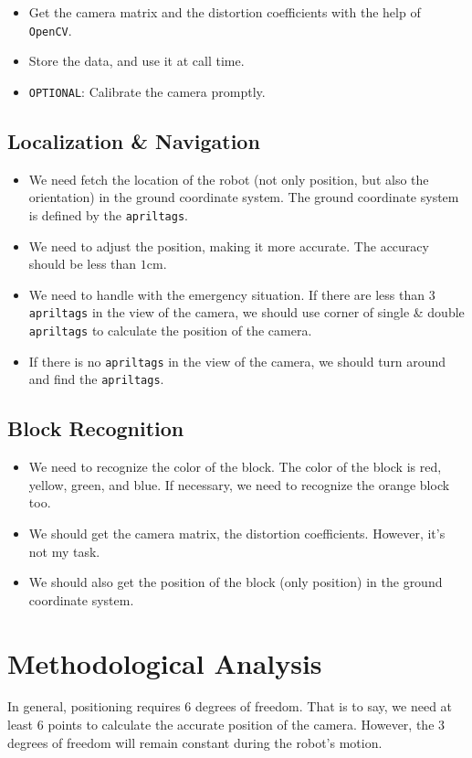 \documentclass{article}
\begin{document}
\begin{itemize}
  \item Get the camera matrix and the distortion coefficients with the help of \texttt{OpenCV}.
  \item Store the data, and use it at call time.
  \item \texttt{OPTIONAL}: Calibrate the camera promptly.
\end{itemize}

\subsection{Localization \& Navigation}

\begin{itemize}
  \item We need fetch the location of the robot (not only position, but also the orientation) in the ground coordinate system. The ground coordinate system is defined by the \texttt{apriltags}.
  \item We need to adjust the position, making it more accurate. The accuracy should be less than $1\mathrm{cm}$.
  \item We need to handle with the emergency situation. If there are less than $3$ \texttt{apriltags} in the view of the camera, we should use corner of single \& double \texttt{apriltags} to calculate the position of the camera.
  \item If there is no \texttt{apriltags} in the view of the camera, we should turn around and find the \texttt{apriltags}.
\end{itemize}

\subsection{Block Recognition}

\begin{itemize}
  \item We need to recognize the color of the block. The color of the block is red, yellow, green, and blue. If necessary, we need to recognize the orange block too.
  \item We should get the camera matrix, the distortion coefficients. However, it's not my task.
  \item We should also get the position of the block (only position) in the ground coordinate system.
\end{itemize}

\section{Methodological Analysis}
In general, positioning requires $6$ degrees of freedom. That is to say, we need at least $6$ points to calculate the accurate position of the camera. However, the $3$ degrees of freedom will remain constant during the robot's motion.
\end{document}
